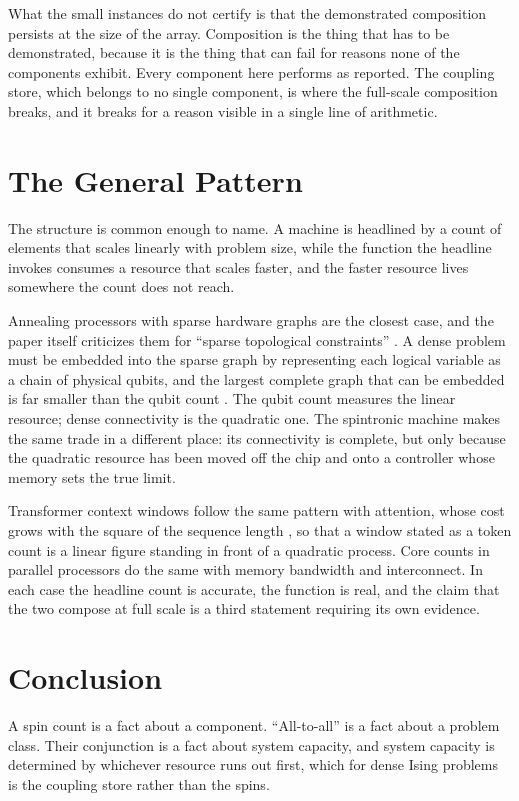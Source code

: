 \documentclass[11pt]{article}
\theoremstyle{definition}
\theoremstyle{remark}
\begin{document}
What the small instances do not certify is that the demonstrated composition persists at the size of the array. Composition is the thing that has to be demonstrated, because it is the thing that can fail for reasons none of the components exhibit. Every component here performs as reported. The coupling store, which belongs to no single component, is where the full-scale composition breaks, and it breaks for a reason visible in a single line of arithmetic.

\section{The General Pattern}

The structure is common enough to name. A machine is headlined by a count of elements that scales linearly with problem size, while the function the headline invokes consumes a resource that scales faster, and the faster resource lives somewhere the count does not reach.

Annealing processors with sparse hardware graphs are the closest case, and the paper itself criticizes them for ``sparse topological constraints'' \cite{li2026}. A dense problem must be embedded into the sparse graph by representing each logical variable as a chain of physical qubits, and the largest complete graph that can be embedded is far smaller than the qubit count \cite{choi2008}. The qubit count measures the linear resource; dense connectivity is the quadratic one. The spintronic machine makes the same trade in a different place: its connectivity is complete, but only because the quadratic resource has been moved off the chip and onto a controller whose memory sets the true limit.

Transformer context windows follow the same pattern with attention, whose cost grows with the square of the sequence length \cite{vaswani2017}, so that a window stated as a token count is a linear figure standing in front of a quadratic process. Core counts in parallel processors do the same with memory bandwidth and interconnect. In each case the headline count is accurate, the function is real, and the claim that the two compose at full scale is a third statement requiring its own evidence.

\section{Conclusion}

A spin count is a fact about a component. ``All-to-all'' is a fact about a problem class. Their conjunction is a fact about system capacity, and system capacity is determined by whichever resource runs out first, which for dense Ising problems is the coupling store rather than the spins.
\end{document}
